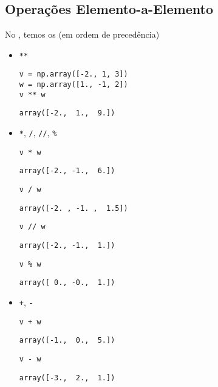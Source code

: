 \subsection{Operações Elemento-a-Elemento}

No {\numpy}, temos os  (em ordem de precedência)
\begin{itemize}
\item \lstinline!**!

\begin{lstlisting}[xrightmargin=2.5em]
v = np.array([-2., 1, 3])
w = np.array([1., -1, 2])
v ** w
\end{lstlisting}

\begin{verbatim}
array([-2.,  1.,  9.])
\end{verbatim}

\item \lstinline!*!, \lstinline!/!, \lstinline!//!, \lstinline!%!

\begin{lstlisting}[xrightmargin=2.5em]
v * w
\end{lstlisting}

\begin{verbatim}
array([-2., -1.,  6.])
\end{verbatim}

\begin{lstlisting}
v / w
\end{lstlisting}

\begin{verbatim}
array([-2. , -1. ,  1.5])
\end{verbatim}

\begin{lstlisting}
v // w
\end{lstlisting}

\begin{verbatim}
array([-2., -1.,  1.])
\end{verbatim}

\begin{lstlisting}
v % w
\end{lstlisting}

\begin{verbatim}
array([ 0., -0.,  1.])
\end{verbatim}


\item \lstinline!+!, \lstinline!-!

\begin{lstlisting}[xrightmargin=2.5em]
v + w
\end{lstlisting}

\begin{verbatim}
array([-1.,  0.,  5.])
\end{verbatim}

\begin{lstlisting}
v - w
\end{lstlisting}

\begin{verbatim}
array([-3.,  2.,  1.])
\end{verbatim}

\end{itemize}

